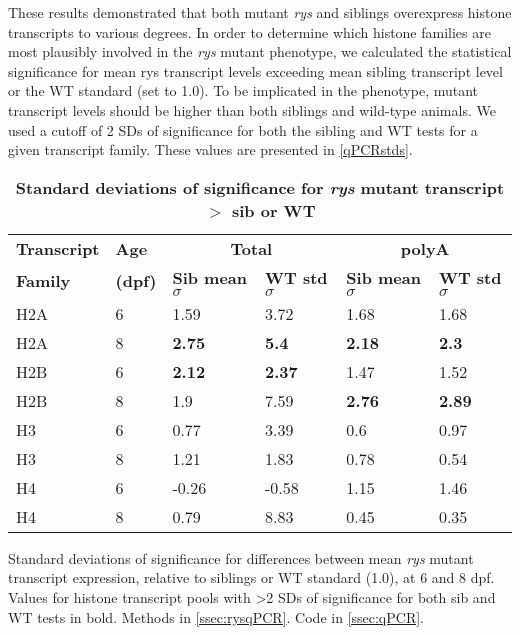 These results demonstrated that both mutant \textit{rys} and siblings overexpress histone transcripts to various degrees. In order to determine which histone families are most plausibly involved in the \textit{rys} mutant phenotype, we calculated the statistical significance for mean rys transcript levels exceeding mean sibling transcript level or the WT standard (set to 1.0). To be implicated in the phenotype, mutant transcript levels should be higher than both siblings and wild-type animals. We used a cutoff of 2 SDs of significance for both the sibling and WT tests for a given transcript family. These values are presented in \autoref{qPCRstds}.

\begin{table}[!ht]
    \centering
    \caption{{\bf Standard deviations of significance for \textit{rys} mutant transcript $>$ sib or WT}}
    \begin{tabular}{|l|l|l|l|l|l|} 
        \hline {\bf Transcript} & {\bf Age} & \multicolumn{2}{c|}{\bf{Total}} & \multicolumn{2}{c|}{\bf{polyA}}\\ \cline{3-6}
        {\bf Family} & {\bf (dpf)} & {\bf Sib mean $\sigma$} & {\bf WT std $\sigma$} & {\bf Sib mean $\sigma$} & {\bf WT std $\sigma$}\\ \hline 
        H2A & 6 & 1.59 & 3.72 & 1.68 & 1.68\\ \hline
        H2A & 8 & {\bf 2.75} & {\bf 5.4} & {\bf 2.18} & {\bf 2.3}\\ \hline
        H2B & 6 & {\bf 2.12} & {\bf 2.37} & 1.47 & 1.52\\ \hline
        H2B & 8 & 1.9 & 7.59 & {\bf 2.76} & {\bf 2.89}\\ \hline
        H3 & 6 & 0.77 & 3.39 & 0.6 & 0.97\\ \hline
        H3 & 8 & 1.21 & 1.83 & 0.78 & 0.54\\ \hline
        H4 & 6 & -0.26 & -0.58 & 1.15 & 1.46\\ \hline
        H4 & 8 & 0.79 & 8.83 & 0.45 & 0.35\\ \hline
    \end{tabular}
    \begin{flushleft}    \label{qPCRstds}
    Standard deviations of significance for differences between mean \textit{rys} mutant transcript expression, relative to siblings or WT standard (1.0), at 6 and 8 dpf. Values for histone transcript pools with \textgreater2 SDs of significance for both sib and WT tests in bold. 
    Methods in \autoref{ssec:rysqPCR}.
    Code in \autoref{ssec:qPCR}.
    \end{flushleft}
\end{table}

